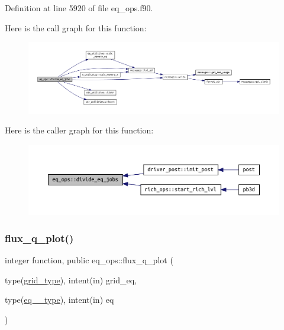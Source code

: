 Definition at line 5920 of file eq\+\_\+ops.\+f90.

Here is the call graph for this function\+:\nopagebreak
\begin{figure}[H]
\begin{center}
\leavevmode
\includegraphics[width=350pt]{namespaceeq__ops_a8fae749abe55865d8135fef536a8e8f1_cgraph}
\end{center}
\end{figure}
Here is the caller graph for this function\+:\nopagebreak
\begin{figure}[H]
\begin{center}
\leavevmode
\includegraphics[width=350pt]{namespaceeq__ops_a8fae749abe55865d8135fef536a8e8f1_icgraph}
\end{center}
\end{figure}
\mbox{\label{namespaceeq__ops_af0effe20188d46a44680c2648e4572e9}} 
\subsubsection{\texorpdfstring{flux\+\_\+q\+\_\+plot()}{flux\_q\_plot()}}
{\footnotesize\ttfamily integer function, public eq\+\_\+ops\+::flux\+\_\+q\+\_\+plot (\begin{DoxyParamCaption}\item[{type(\hyperlink{structgrid__vars_1_1grid__type}{grid\+\_\+type}), intent(in)}]{grid\+\_\+eq,  }\item[{type(\hyperlink{structeq__vars_1_1eq__1__type}{eq\+\_\+1\+\_\+type}), intent(in)}]{eq }\end{DoxyParamCaption})}



